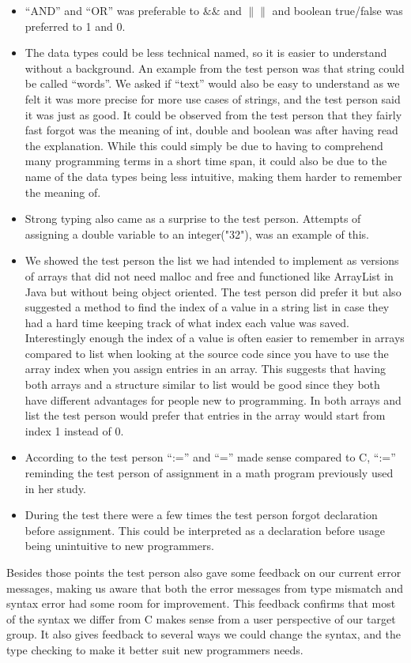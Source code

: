 \begin{itemize}
 \item “AND” and “OR” was preferable to $\&\&$ and $\|\|$ and boolean true/false was preferred to 1 and 0.
 \item The data types could be less technical named, so it is easier to understand without a background. An example from the test person was that string could be called “words”. We asked if “text” would also be easy to understand as we felt it was more precise for more use cases of strings, and the test person said it was just as good. It could be observed from the test person that they fairly fast forgot was the meaning of int, double and boolean was after having read the explanation. While this could simply be due to having to comprehend many programming terms in a short time span, it could also be due to the name of the data types being less intuitive, making them harder to remember the meaning of.
 \item Strong typing also came as a surprise to the test person. Attempts of assigning a double variable to an integer("32"), was an example of this.
 \item We showed the test person the list we had intended to implement as versions of arrays that did not need malloc and free and functioned like ArrayList in Java but without being object oriented. The test person did prefer it but also suggested a method to find the index of a value in a string list in case they had a hard time keeping track of what index each value was saved. Interestingly enough the index of a value is often easier to remember in arrays compared to list when looking at the source code since you have to use the array index when you assign entries in an array. This suggests that having both arrays and a structure similar to list would be good since they both have different advantages for people new to programming. In both arrays and list the test person would prefer that entries in the array would start from index 1 instead of 0.
 \item According to the test person “:=” and “=” made sense compared to C, “:=” reminding the test person of assignment in a math program previously used in her study.
 \item During the test there were a few times the test person forgot declaration before assignment. This could be interpreted as a declaration before usage being unintuitive to new programmers.
\end{itemize}

Besides those points the test person also gave some feedback on our current error messages, making us aware that both the error messages from type mismatch and syntax error had some room for improvement.
This feedback confirms that most of the syntax we differ from C makes sense from a user perspective of our target group. It also gives feedback to several ways we could change the syntax, and the type checking to make it better suit new programmers needs.